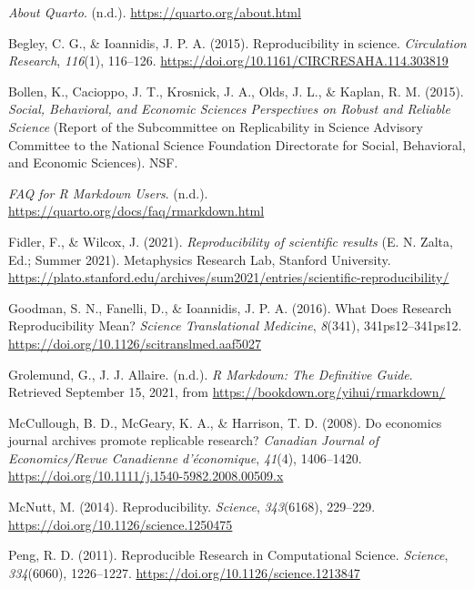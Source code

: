 \documentclass[
  a4paper,
]{article}
\newlength{\cslhangindent}
\newenvironment{CSLReferences}[2] %
 {\begin{list}{}{%
  \setlength{\itemindent}{0pt}
  \setlength{\leftmargin}{0pt}
  \setlength{\parsep}{0pt}
  \ifodd #1
   \setlength{\leftmargin}{\cslhangindent}
   \setlength{\itemindent}{-1\cslhangindent}
  \fi
  \setlength{\itemsep}{#2\baselineskip}}}
 {\end{list}}
\begin{document}
\label{refs}
\begin{CSLReferences}{1}{0}
\emph{About Quarto}. (n.d.). \url{https://quarto.org/about.html}

Begley, C. G., \& Ioannidis, J. P. A. (2015). Reproducibility in
science. \emph{Circulation Research}, \emph{116}(1), 116--126.
\url{https://doi.org/10.1161/CIRCRESAHA.114.303819}

Bollen, K., Cacioppo, J. T., Krosnick, J. A., Olds, J. L., \& Kaplan, R.
M. (2015). \emph{Social, {Behavioral}, and {Economic Sciences
Perspectives} on {Robust} and {Reliable Science}} (Report of the
Subcommittee on Replicability in Science Advisory Committee to the
National Science Foundation Directorate for Social, Behavioral, and
Economic Sciences). {NSF}.

\emph{FAQ for R Markdown Users}. (n.d.).
\url{https://quarto.org/docs/faq/rmarkdown.html}

Fidler, F., \& Wilcox, J. (2021). \emph{Reproducibility of scientific
results} (E. N. Zalta, Ed.; Summer 2021). Metaphysics Research Lab,
Stanford University.
\url{https://plato.stanford.edu/archives/sum2021/entries/scientific-reproducibility/}

Goodman, S. N., Fanelli, D., \& Ioannidis, J. P. A. (2016). What {Does
Research Reproducibility Mean}? \emph{Science Translational Medicine},
\emph{8}(341), 341ps12--341ps12.
\url{https://doi.org/10.1126/scitranslmed.aaf5027}

Grolemund, G., J. J. Allaire. (n.d.). \emph{R {Markdown}: {The
Definitive Guide}}. Retrieved September 15, 2021, from
\url{https://bookdown.org/yihui/rmarkdown/}

McCullough, B. D., McGeary, K. A., \& Harrison, T. D. (2008). Do
economics journal archives promote replicable research? \emph{Canadian
Journal of Economics/Revue Canadienne d'économique}, \emph{41}(4),
1406--1420. \url{https://doi.org/10.1111/j.1540-5982.2008.00509.x}

McNutt, M. (2014). Reproducibility. \emph{Science}, \emph{343}(6168),
229--229. \url{https://doi.org/10.1126/science.1250475}

Peng, R. D. (2011). Reproducible {Research} in {Computational Science}.
\emph{Science}, \emph{334}(6060), 1226--1227.
\url{https://doi.org/10.1126/science.1213847}


\end{CSLReferences}
\end{document}

